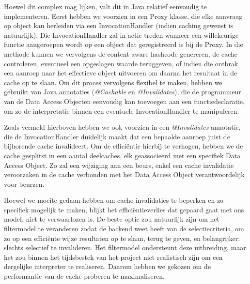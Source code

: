Hoewel dit complex mag lijken, valt dit in Java relatief eenvoudig te implementeren. Eerst hebben we voorzien in een Proxy klasse, die elke aanvraag op object kan herleiden via een InvocationHandler (indien caching gewenst is natuurlijk). Die InvocationHandler zal in actie treden wanneer een willekeurige functie aangeroepen wordt op een object dat geregistreerd is bij de Proxy. In die methode kunnen we vervolgens de content-aware hashcode genereren, de cache controleren, eventueel een opgeslagen waarde teruggeven, of indien die ontbrak een aanroep naar het effectieve object uitvoeren om daarna het resultaat in de cache op te slaan.
Om dit proces vervolgens flexibel te maken, hebben we gebruikt van Java annotaties (\emph{@Cachable} en \emph{@Invalidates}), die de programmeur van de Data Access Objecten eenvoudig kan toevoegen aan een functiedeclaratie, om zo de interpretatie binnen een eventuele InvocationHandler te manipuleren.

Zoals vermeld hierboven hebben we ook voorzien in een \emph{@Invalidates} annotatie, die de InvocationHandler duidelijk maakt dat een bepaalde aanroep juist de bijhorende cache invalideert. Om de effici\"entie hierbij te verhogen, hebben we de cache gesplitst in een aantal deelcaches, elk geassocieerd met een specifiek Data Access Object. Zo zal een wijziging aan een beurs, enkel een cache invalidatie veroorzaken in de cache verbonden met het Data Access Object verantwoordelijk voor beurzen.

Hoewel we moeite gedaan hebben om cache invalidaties te beperken en zo specifiek mogelijk te maken, blijkt het effici\"entieverlies dat gepaard gaat met ons model, niet te verwaarlozen is. De beste optie zou natuurlijk zijn om het filtermodel te veranderen zodat de backend weet heeft van de selectiecriteria, om zo op een effici\"ente wijze resultaten op te slaan, terug te geven, en belangrijker: slechts selectief te invalideren. Het filtermodel ondersteunt deze uitbreiding, maar het zou binnen het tijdsbestek van het project niet realistisch zijn om een dergelijke interpreter te realiseren. Daarom hebben we gekozen om de performantie van de cache proberen te maximaliseren.

